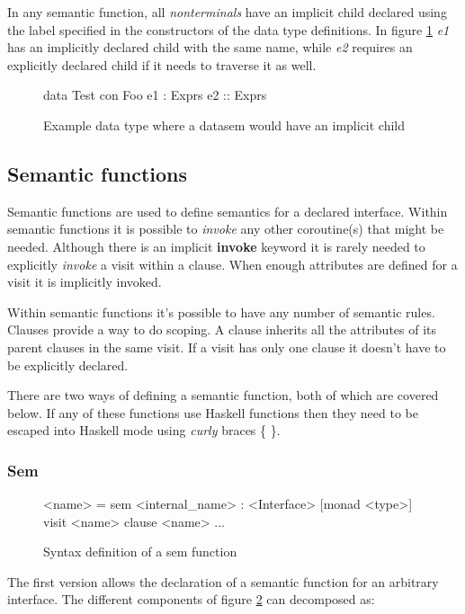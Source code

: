 In any semantic function, all \emph{nonterminals} have an implicit child declared using the label specified in the constructors of the data type definitions. In figure \ref{child:test} \emph{e1} has an implicitly declared child with the same name, while \emph{e2} requires an explicitly declared child if it needs to traverse it as well.

\begin{figure}[!h]
\begin{code}
data Test
  con Foo
   e1 :  Exprs
   e2 :: Exprs
\end{code}
\caption{Example data type where a datasem would have an implicit child}
\label{child:test}
\end{figure}
\subsection{Semantic functions}
Semantic functions are used to define semantics for a declared interface. Within semantic functions it is possible to \emph{invoke} any other coroutine(s) that might be needed. Although there is an implicit \textbf{invoke} keyword it is rarely needed to explicitly \emph{invoke} a visit within a clause. When enough attributes are defined for a visit it is implicitly invoked.

Within semantic functions it's possible to have any number of semantic rules. Clauses provide a way to do scoping. A clause inherits all the attributes of its parent clauses in the same visit. If a visit has only one clause it doesn't have to be explicitly declared. 

There are two ways of defining a semantic function, both of which are covered below. If any of these functions use Haskell functions then they need to be escaped into Haskell mode using \emph{curly} braces \{ \}.
\subsubsection{Sem}
\begin{figure}[!h]
\begin{code}
<name> = sem <internal_name> : <Interface> [monad <type>]
          {visit <name>
             {clause <name>
                ...
             }
          }
\end{code}
\caption{Syntax definition of a sem function}
\label{sem:syntax}
\end{figure}

The first version allows the declaration of a semantic function for an arbitrary interface. The different components of figure \ref{sem:syntax} can decomposed as:

